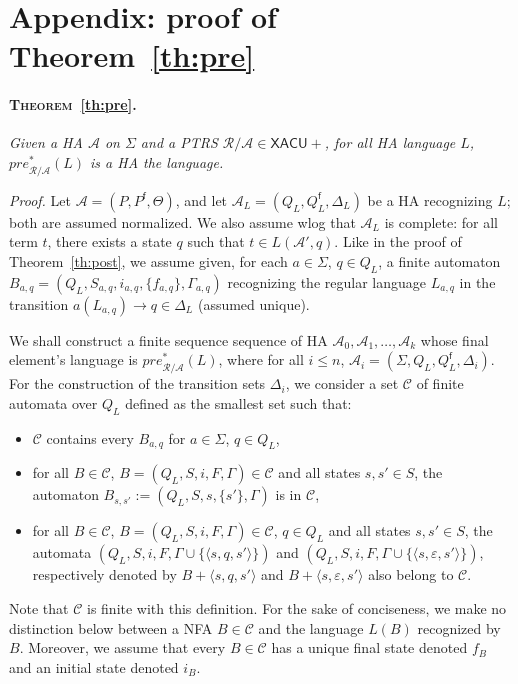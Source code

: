 \documentclass[a4paper]{article}
\theoremstyle{plain}
\newenvironment{proof}{\noindent\emph{Proof.}}{}
\newcommand{\R}{\mathcal{R}}
\newcommand{\F}{\Sigma}
\newcommand{\A}{\mathcal{A}}
\newcommand{\C}{\mathcal{C}}
\newcommand{\ptrs}[2]{{#1}{/}{#2}}
\newcommand{\final}{\mathsf{f}}
\newcommand{\init}{\mathit{i}}
\newcommand{\pre}{\mathit{pre}}
\newcommand{\XACU}{\textsf{XACU}}
\begin{document}
\section{Appendix: proof of Theorem~\ref{th:pre}}
\label{app:pre*}

\paragraph{\textsc{Theorem}~\ref{th:pre}.}
{\it
Given a HA $\A$ on $\Sigma$ and a PTRS $\ptrs{\R}{\A} \in \XACU+$,
for all HA language $L$, $\pre_{\ptrs{\R}{\A}}^*(L)$
is a HA the language.}

\medskip
\begin{proof}
Let $\A = (P, P^\final, \Theta)$,
and let  $\A_L = (Q_L, Q_L^\final, \Delta_L)$ be a HA recognizing $L$;
both are assumed normalized.
We also assume wlog that $\A_L$ is complete:
for all term $t$, there exists a state $q$ such that $t \in L(\A', q)$.
Like in the proof of Theorem~\ref{th:post},
we assume given, for each $a \in \F$, $q \in Q_L$,
a finite automaton 
$B_{a, q} = (Q_L, S_{a, q}, i_{a, q}, \{ f_{a, q} \}, \Gamma_{a, q})$
recognizing the regular language $L_{a, q}$ 
in the transition $a(L_{a, q}) \to q \in \Delta_L$ (assumed unique).


We shall construct a finite sequence sequence of HA 
$\A_0, \A_1, \ldots, \A_k$ whose final element's language is $\pre^*_{\ptrs{\R}{\A}}(L)$,
where for all $i \leq n$, 
$\A_i = (\F, Q_L, Q_L^\final, \Delta_i)$.
For the construction of the transition sets $\Delta_{i}$,
we consider a set $\C$ of finite automata over $Q_L$
defined as the smallest set such that:
\begin{itemize}
\item $\C$ contains every $B_{a, q}$ for $a \in \F$, $q \in Q_L$,
\item for all $B\in \C$, $B = (Q_L, S, i, F, \Gamma) \in \C$
and all states $s, s' \in S$, the automaton 
$B_{s,s'} := (Q_L, S, s, \{ s' \}, \Gamma)$ is in $\C$,
\item for all $B \in \C$, $B = (Q_L, S, i, F, \Gamma) \in \C$,
$q \in Q_L$ and all states $s, s' \in S$, the automata
$(Q_L, S, i, F, \Gamma \cup \{ \langle s,q,s'\rangle \})$ and
$(Q_L, S, i, F, \Gamma \cup \{ \langle s,\varepsilon,s'\rangle \})$,
respectively denoted by
$B+\langle s,q,s'\rangle$ and $B + \langle s,\varepsilon,s'\rangle $
also belong to $\C$.
\end{itemize}
Note that $\C$ is finite with this definition.
For the sake of conciseness, 
we make no distinction below between a NFA $B \in \C$
and the language $L(B)$ recognized by $B$.
Moreover, we assume that every $B \in \C$ has a unique final state
denoted $f_B$ and an initial state denoted $\init_B$.


\end{proof}
\end{document}
